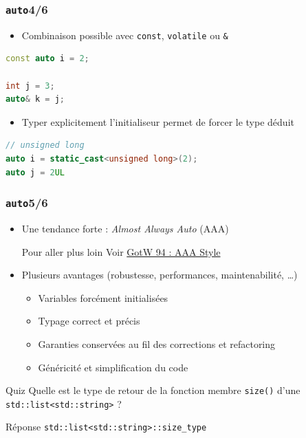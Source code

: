 \documentclass[C++.tex]{subfiles}
\begin{document}
\begin{frame}[fragile]
	\frametitle{\lstinline|auto|\titlehfill{}4/6}
	\begin{itemize}
		\item Combinaison possible avec \lstinline|const|, \lstinline|volatile| ou \lstinline|&|
	\end{itemize}

	\begin{lstlisting}[language=C++]
const auto i = 2;

int j = 3;
auto& k = j;\end{lstlisting}

	\begin{itemize}
		\item Typer explicitement l'initialiseur permet de forcer le type déduit
	\end{itemize}

	\begin{lstlisting}[language=C++]
// unsigned long
auto i = static_cast<unsigned long>(2);
auto j = 2UL\end{lstlisting}
\end{frame}

\begin{frame}[fragile]
	\frametitle{\lstinline|auto|\titlehfill{}5/6}
	\begin{itemize}
		\item Une tendance forte : \textit{Almost Always Auto} (AAA)

		\begin{block}{Pour aller plus loin}
			Voir \href{https://herbsutter.com/2013/08/12/gotw-94-solution-aaa-style-almost-always-auto/}{GotW 94 : AAA Style}
		\end{block}

		\item Plusieurs avantages (robustesse, performances, maintenabilité, \ldots)
		\begin{itemize}
			\item Variables forcément initialisées
			\item Typage correct et précis
			\item Garanties conservées au fil des corrections et refactoring
			\item Généricité et simplification du code

		\end{itemize}
	\end{itemize}

	\begin{block}{Quiz}
		Quelle est le type de retour de la fonction membre \lstinline|size()| d'une \lstinline|std::list<std::string>| ?
	\end{block}

	\begin{block}{Réponse}
		\lstinline|std::list<std::string>::size_type|
	\end{block}
\end{frame}
\end{document}
